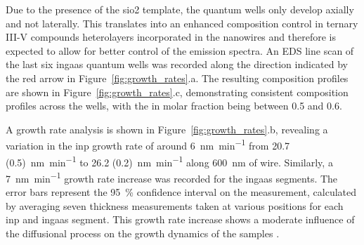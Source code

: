\par
Due to the presence of the \acs{sio2} template, the quantum wells only develop axially and not laterally. This translates into an enhanced composition control in ternary III-V compounds heterolayers incorporated in the nanowires \cite{Borg2019} and therefore is expected to allow for better control of the emission spectra. An EDS line scan of the last six \acs{ingaas} quantum wells was recorded along the direction indicated by the red arrow in Figure~\ref{fig:growth_rates}.a. The resulting composition profiles are shown in Figure~\ref{fig:growth_rates}.c, demonstrating consistent composition profiles across the wells, with the \acs{in} molar fraction being between \num{0.5} and \num{0.6}.
\par
A growth rate analysis is shown in Figure~\ref{fig:growth_rates}.b, revealing a variation in the \acs{inp} growth rate of around \qty{6}{\nm\per\minute} from \qty[separate-uncertainty=true]{20.7 (0.5)}{\nano\metre\per\minute} to \qty[separate-uncertainty=true]{26.2 (0.2)}{\nano\metre\per\minute} along \qty{600}{\nm} of wire. Similarly, a \qty{7}{\nano\metre\per\minute} growth rate increase was recorded for the \acs{ingaas} segments. The error bars represent the \qty{95}{\%} confidence interval on the measurement, calculated by averaging seven thickness measurements taken at various positions for each \acs{inp} and \acs{ingaas} segment. This growth rate increase shows a moderate influence of the diffusional process on the growth dynamics of the samples \cite{bjork2012}.

